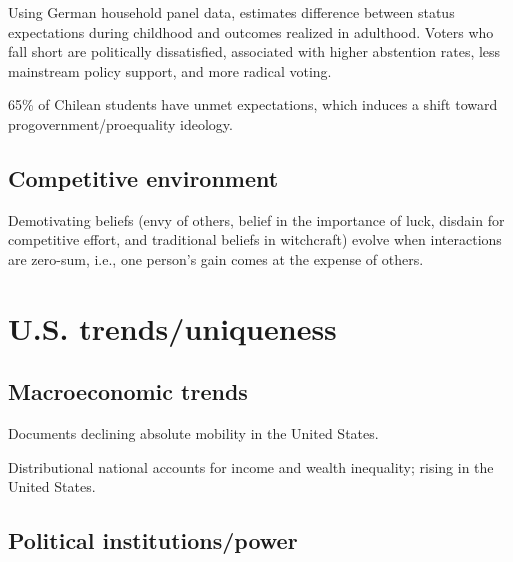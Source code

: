\documentclass{article}
\newcommand{\citem}[1]{\medskip \noindent \textbf{\cite*{#1}}}
\begin{document}
Using German household panel data, estimates difference between status expectations during childhood and outcomes realized in adulthood. Voters who fall short are politically dissatisfied, associated with higher abstention rates, less mainstream policy support, and more radical voting.

\citem{cox2024great}

65\% of Chilean students have unmet expectations, which induces a shift toward progovernment/proequality ideology.

\subsection{Competitive environment}

\citem{carvalho2023zero}

Demotivating beliefs (envy of others, belief in the importance of luck, disdain for competitive
effort, and traditional beliefs in witchcraft) evolve when interactions are zero-sum, i.e., one person's gain comes at the expense of others.





\section{U.S. trends/uniqueness}



\subsection{Macroeconomic trends}

\citem{chetty2017fading}

Documents declining absolute mobility in the United States.

\citem{piketty2018distributional}

Distributional national accounts for income and wealth inequality; rising in the United States.


\subsection{Political institutions/power}
\end{document}

